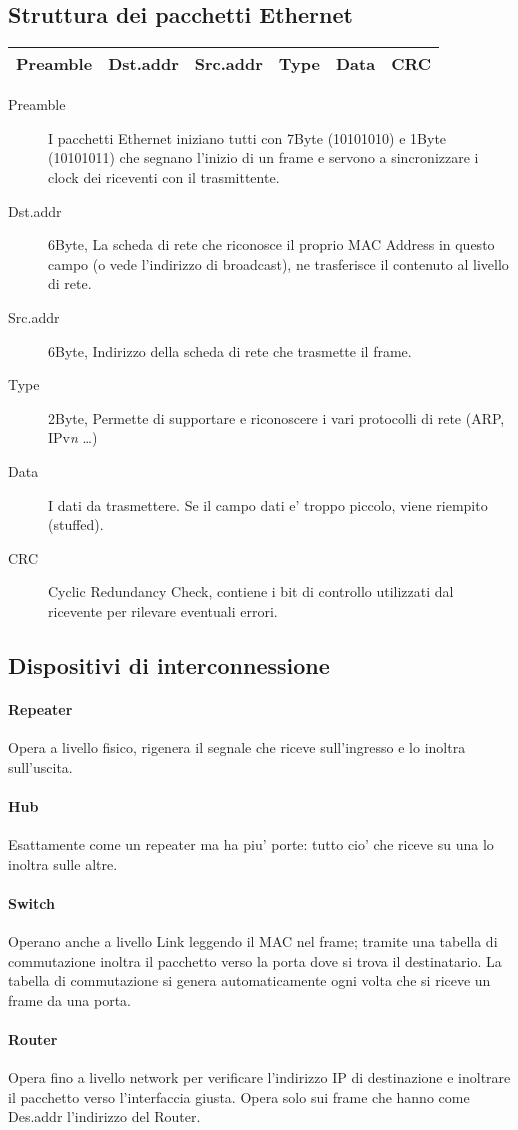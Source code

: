 \subsection{Struttura dei pacchetti Ethernet}
\begin{center}
    \begin{tabular}{|c|c|c|c|c|c|}
        \hline
        Preamble & Dst.addr & Src.addr & Type & Data & CRC\\
        \hline
    \end{tabular}
\end{center}
\begin{description}
    \item[Preamble] I pacchetti Ethernet iniziano tutti con 7Byte (10101010) e 1Byte (10101011) che segnano l'inizio di un frame e servono a sincronizzare i clock dei riceventi con il trasmittente.
    \item[Dst.addr] 6Byte, La scheda di rete che riconosce il proprio MAC Address in questo campo (o vede l'indirizzo di broadcast), ne trasferisce il contenuto al livello di rete.
    \item[Src.addr] 6Byte, Indirizzo della scheda di rete che trasmette il frame.
    \item[Type] 2Byte, Permette di supportare e riconoscere i vari protocolli di rete (ARP, IPv\textit{n} \dots)
    \item[Data] I dati da trasmettere. Se il campo dati e' troppo piccolo, viene riempito (stuffed).
    \item[CRC] Cyclic Redundancy Check, contiene i bit di controllo utilizzati dal ricevente per rilevare eventuali errori.
\end{description}
\subsection{Dispositivi di interconnessione}
\paragraph{Repeater} Opera a livello fisico, rigenera il segnale che riceve sull'ingresso e lo inoltra sull'uscita.
\paragraph{Hub} Esattamente come un repeater ma ha piu' porte: tutto cio' che riceve su una lo inoltra sulle altre.
\paragraph{Switch} Operano anche a livello Link leggendo il MAC nel frame; tramite una tabella di commutazione inoltra il pacchetto verso la porta dove si trova il destinatario. La tabella di commutazione si genera automaticamente ogni volta che si riceve un frame da una porta.
\paragraph{Router} Opera fino a livello network per verificare l'indirizzo IP di destinazione e inoltrare il pacchetto verso l'interfaccia giusta. Opera solo sui frame che hanno come Des.addr l'indirizzo del Router.